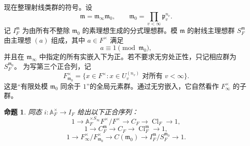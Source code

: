 \documentclass[11pt,a4paper,openany]{ctexbook}
\numberwithin{equation}{chapter}
\newcommand{\A}{\mathbb{A}}
\newcommand{\Cl}{\operatorname{Cl}}
\theoremstyle{plain}
\newtheorem{proposition}[theorem]{命题}
\theoremstyle{definition}
\theoremstyle{remark}
\begin{document}
现在整理射线类群的符号。设
\[
 \mathfrak m=\mathfrak m_\infty\mathfrak m_0,\qquad
 \mathfrak m_0=\prod_{v<\infty}\mathfrak p_v^{n_v}.
\]
记 $I_F^{\mathfrak m}$ 为由所有不整除 $\mathfrak m_0$ 的素理想生成的分式理想群。模 $\mathfrak m$ 的射线主理想群 $S_F^{\mathfrak m}$ 由主理想 $(a)$ 组成，其中 $a\in F^\times$ 满足
\[
 a\equiv1\pmod{\mathfrak m_0},
\]
并且在 $\mathfrak m_\infty$ 中指定的所有实嵌入下为正。若不要求无穷处正性，只记相应群为 $S_F^{\mathfrak m_0}$。
为写第三个正合列，记
\[
F_{\mathfrak m_0}^\times
=\{x\in F^\times: x\in U_v^{(n_v)}\text{ 对所有 }v<\infty\}.
\]
这是“有限处模 $\mathfrak m_0$ 同余于 $1$”的全局元素群。通过无穷嵌入，它自然看作
$F_\infty^\times$ 的子群。

\begin{proposition}
同态 $i:\A_F^\times\to I_F$ 给出以下正合序列：
\[
 1\to \A_F^{\times S_\infty}F^\times/F^\times
 \to C_F\to \Cl_F\to1,
\]
\[
 1\to C_F^{\mathfrak m}\to C_F\to \Cl_F^{\mathfrak m}\to1,
\]
\[
 1\to
 F_\infty^\times/F_{\mathfrak m_0}^\times
 \to C(\mathfrak m_0)
 \to I_F^{\mathfrak m}/S_F^{\mathfrak m_0}
 \to1.
\]
\end{proposition}
\end{document}
